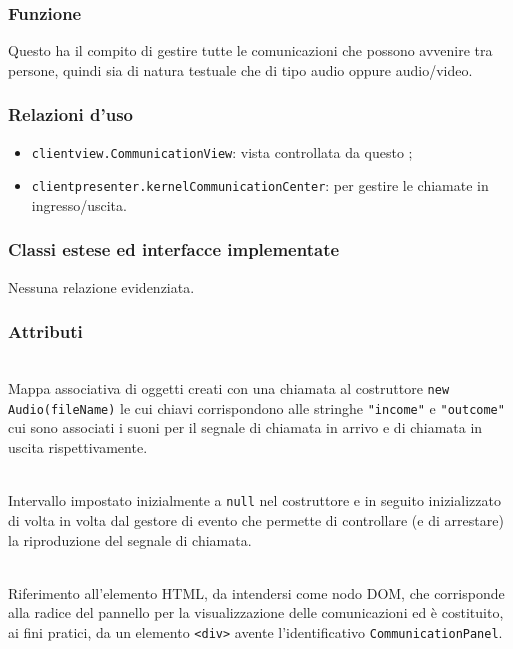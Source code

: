 \subsubsection*{Funzione}
Questo  ha il compito di gestire tutte le comunicazioni che possono avvenire tra persone, quindi sia di natura testuale che di tipo audio oppure audio/video.

\subsubsection*{Relazioni d'uso}
\begin{itemize}
  \item \texttt{clientview.CommunicationView}: vista controllata da questo ;
  \item \texttt{clientpresenter.kernelCommunicationCenter}: per gestire le chiamate in ingresso/uscita.
\end{itemize}

\subsubsection*{Classi estese ed interfacce implementate}
Nessuna relazione evidenziata.

\subsubsection*{Attributi}
\begin{description}

  \item{}\\
  Mappa associativa di oggetti creati con una chiamata al costruttore \verb'new Audio(fileName)' le cui chiavi corrispondono alle stringhe \verb'"income"' e \verb'"outcome"' cui sono associati i suoni per il segnale di chiamata in arrivo e di chiamata in uscita rispettivamente.
  
  \item{}\\
  Intervallo impostato inizialmente a \verb'null' nel costruttore e in seguito inizializzato di volta in volta dal gestore di evento  che permette di controllare (e di arrestare) la riproduzione del segnale di chiamata.
  
\item{}\\
Riferimento all'elemento HTML, da intendersi come nodo DOM, che corrisponde alla radice del pannello per la visualizzazione delle comunicazioni ed è costituito, ai fini pratici, da un elemento \verb'<div>' avente l'identificativo \verb'CommunicationPanel'.

\end{description}

